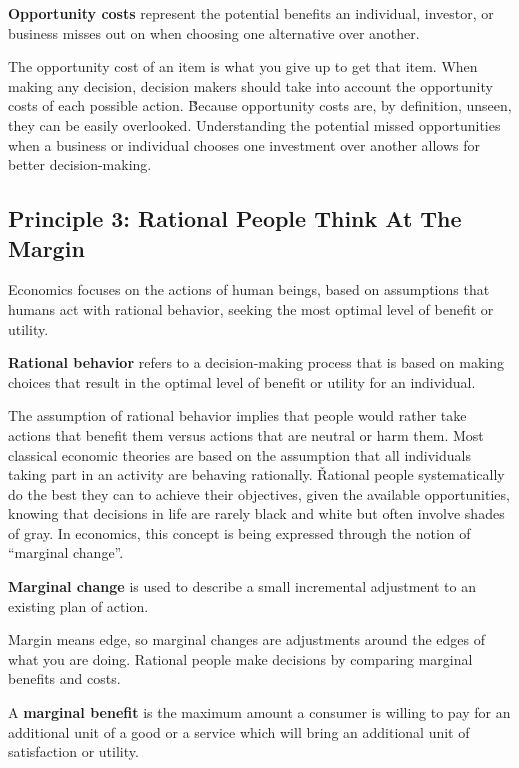  \label{def:opportunity_cost}
\textbf{Opportunity costs} represent the potential benefits an individual, investor, or business misses out on when
choosing one alternative over another.
\ed

The opportunity cost of an item is what you give up to get that item. When making any decision, decision makers should
take into account the opportunity costs of each possible action. \v

Because opportunity costs are, by definition, unseen, they can be easily overlooked. Understanding the potential
missed opportunities when a business or individual chooses one investment over another allows for better decision-making.

\subsection*{Principle 3: Rational People Think At The Margin}

Economics focuses on the actions of human beings, based on assumptions that humans act with rational behavior, seeking
the most optimal level of benefit or utility.

\textbf{Rational behavior} refers to a decision-making process that is based on making choices that result in the
optimal level of benefit or utility for an individual.
\ed

The assumption of rational behavior implies that people would rather take actions that benefit them versus actions
that are neutral or harm them. Most classical economic theories are based on the assumption that all individuals
taking part in an activity are behaving rationally. \v

Rational people systematically do the best they can to achieve their objectives, given the available opportunities,
knowing that decisions in life are rarely black and white but often involve shades of gray. In economics, this
concept is being expressed through the notion of ``marginal change''.

\textbf{Marginal change} is used to describe a small incremental adjustment to an existing plan of action.
\ed

Margin means edge, so marginal changes are adjustments around the edges of what you are doing. Rational people make
decisions by comparing marginal benefits and costs.

A \textbf{marginal benefit} is the maximum amount a consumer is willing to pay for an additional unit of a good or a
service which will bring an additional unit of satisfaction or utility.
\ed

